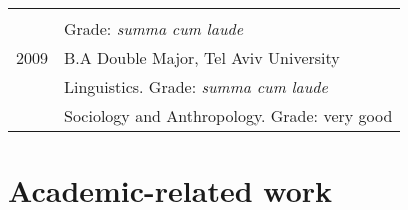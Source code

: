 \documentclass[]{article}
\begin{document}
\begin{longtable}[]{@{}ll@{}}
\begin{minipage}[t]{0.69\columnwidth}
\end{minipage}\tabularnewline
\begin{minipage}[t]{0.25\columnwidth}\raggedright
\strut
\end{minipage} & \begin{minipage}[t]{0.69\columnwidth}\raggedright
Grade: \emph{summa cum laude} \strut
\end{minipage}\tabularnewline
\begin{minipage}[t]{0.25\columnwidth}\raggedright
2009\strut
\end{minipage} & \begin{minipage}[t]{0.69\columnwidth}\raggedright
B.A Double Major, Tel Aviv University\strut
\end{minipage}\tabularnewline
\begin{minipage}[t]{0.25\columnwidth}\raggedright
\strut
\end{minipage} & \begin{minipage}[t]{0.69\columnwidth}\raggedright
Linguistics. Grade: \emph{summa cum laude}\strut
\end{minipage}\tabularnewline
\begin{minipage}[t]{0.25\columnwidth}\raggedright
\strut
\end{minipage} & \begin{minipage}[t]{0.69\columnwidth}\raggedright
Sociology and Anthropology. Grade: very good\strut
\end{minipage}\tabularnewline
\bottomrule
\end{longtable}

\hypertarget{academic-related-work}{%
\section{Academic-related work}\label{academic-related-work}}
\end{document}
